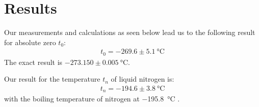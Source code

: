 \section{Results}

Our measurements and calculations as seen below lead us to the following result for absolute zero $t_0$:
\begin{align}
	t_0 = -269.6 \pm \SI{5.1}{\degreeCelsius} 
\end{align}
The exact result is $-273.150 \pm \SI{0.005}{\degreeCelsius}$. 


Our result for the temperature $t_n$ of liquid nitrogen is:
\begin{align}
	t_n = -194.6 \pm \SI{3.8}{\degreeCelsius} 
\end{align}
with the boiling temperature of nitrogen \cite{nitro} at \SI{-195.8}{\degreeCelsius}  .
